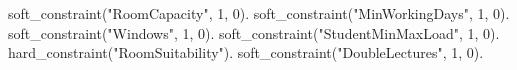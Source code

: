 soft_constraint("RoomCapacity",      1, 0). soft_constraint("MinWorkingDays",    1, 0).
soft_constraint("Windows",           1, 0). soft_constraint("StudentMinMaxLoad", 1, 0).
hard_constraint("RoomSuitability").         soft_constraint("DoubleLectures",    1, 0).
